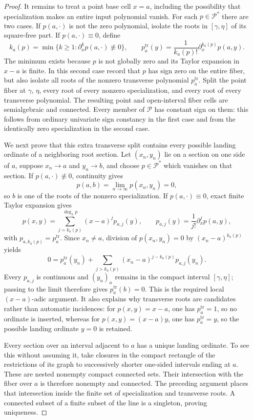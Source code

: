 \documentclass{article}
\begin{document}
\begin{proof}
It remains to treat a point base cell \(x=a\), including the possibility that specialization makes an entire input polynomial vanish.  For each \(p\in\mathscr P^{*}\) there are two cases.  If \(p(a,\cdot)\) is not the zero polynomial, isolate the roots in \([\gamma,\eta]\) of its square-free part.  If \(p(a,\cdot)\equiv0\), define
\[
k_a(p)=\min\bigl\{k\geq 1:\partial_x^k p(a,\cdot)\not\equiv0\bigr\},
\qquad
p_a^{\mathrm{tr}}(y)=\frac{1}{k_a(p)!}\partial_x^{k_a(p)}p(a,y).
\]
The minimum exists because \(p\) is not globally zero and its Taylor expansion in \(x-a\) is finite.  In this second case record that \(p\) has sign zero on the entire fiber, but also isolate all roots of the nonzero transverse polynomial \(p_a^{\mathrm{tr}}\).  Split the point fiber at \(\gamma\), \(\eta\), every root of every nonzero specialization, and every root of every transverse polynomial.  The resulting point and open-interval fiber cells are semialgebraic and connected.  Every member of \(\mathscr P\) has constant sign on them: this follows from ordinary univariate sign constancy in the first case and from the identically zero specialization in the second case.

We next prove that this extra transverse split contains every possible landing ordinate of a neighboring root section.  Let \((x_n,y_n)\) lie on a section on one side of \(a\), suppose \(x_n\to a\) and \(y_n\to b\), and choose \(p\in\mathscr P^{*}\) which vanishes on that section.  If \(p(a,\cdot)\not\equiv0\), continuity gives
\[
p(a,b)=\lim_{n\to\infty}p(x_n,y_n)=0,
\]
so \(b\) is one of the roots of the nonzero specialization.  If \(p(a,\cdot)\equiv0\), exact finite Taylor expansion gives
\[
p(x,y)=\sum_{j=k_a(p)}^{\deg_x p}(x-a)^j p_{a,j}(y),
\qquad
p_{a,j}(y)=\frac{1}{j!}\partial_x^j p(a,y),
\]
with \(p_{a,k_a(p)}=p_a^{\mathrm{tr}}\).  Since \(x_n\neq a\), division of \(p(x_n,y_n)=0\) by \((x_n-a)^{k_a(p)}\) yields
\[
0=p_a^{\mathrm{tr}}(y_n)
  +\sum_{j>k_a(p)}(x_n-a)^{j-k_a(p)}p_{a,j}(y_n).
\]
Every \(p_{a,j}\) is continuous and \((y_n)_n\) remains in the compact interval \([\gamma,\eta]\); passing to the limit therefore gives \(p_a^{\mathrm{tr}}(b)=0\).  This is the required local \((x-a)\)-adic argument.  It also explains why transverse roots are candidates rather than automatic incidences: for \(p(x,y)=x-a\), one has \(p_a^{\mathrm{tr}}=1\), so no ordinate is inserted, whereas for \(p(x,y)=(x-a)y\), one has \(p_a^{\mathrm{tr}}=y\), so the possible landing ordinate \(y=0\) is retained.

Every section over an interval adjacent to \(a\) has a unique landing ordinate.  To see this without assuming it, take closures in the compact rectangle of the restrictions of its graph to successively shorter one-sided intervals ending at \(a\).  These are nested nonempty compact connected sets.  Their intersection with the fiber over \(a\) is therefore nonempty and connected.  The preceding argument places that intersection inside the finite set of specialization and transverse roots.  A connected subset of a finite subset of the line is a singleton, proving uniqueness.


\end{proof}
\end{document}
